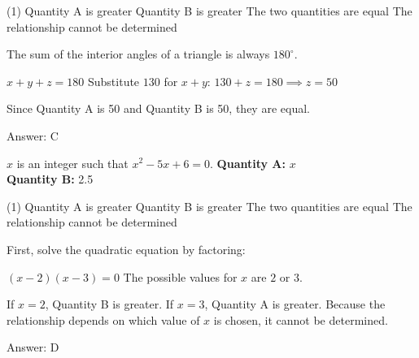 \documentclass[11pt,paper=a4,answers]{exam}
\begin{document}
\begin{questions}
\begin{tasks}(1)
\task[A)] Quantity A is greater
\task[B)] Quantity B is greater
\task[C)] The two quantities are equal
\task[D)] The relationship cannot be determined
\end{tasks}

\begin{solution}
The sum of the interior angles of a triangle is always $180^\circ$.
\vspace{5pt}
\begin{center}
$x + y + z = 180$
\vspace{5pt}
Substitute $130$ for $x + y$:
\vspace{5pt}
$130 + z = 180 \implies z = 50$
\end{center}
\vspace{5pt}
Since Quantity A is 50 and Quantity B is 50, they are equal.

Answer: \colorbox{yellow!100}{C}
\end{solution}

\vspace{1cm}

\question
$x$ is an integer such that $x^2 - 5x + 6 = 0$.
\vspace{5pt}
\textbf{Quantity A: } $x$ \\
\vspace{5pt}
\textbf{Quantity B: } 2.5

\begin{tasks}(1)
\task[A)] Quantity A is greater
\task[B)] Quantity B is greater
\task[C)] The two quantities are equal
\task[D)] The relationship cannot be determined
\end{tasks}

\begin{solution}
First, solve the quadratic equation by factoring:
\vspace{5pt}
\begin{center}
$(x - 2)(x - 3) = 0$
\vspace{5pt}
The possible values for $x$ are $2$ or $3$.
\end{center}
\vspace{5pt}
If $x = 2$, Quantity B is greater. If $x = 3$, Quantity A is greater.
\vspace{5pt}
Because the relationship depends on which value of $x$ is chosen, it cannot be determined.

Answer: \colorbox{yellow!100}{D}
\end{solution}

\vspace{1cm}


\end{questions}
\end{document}

